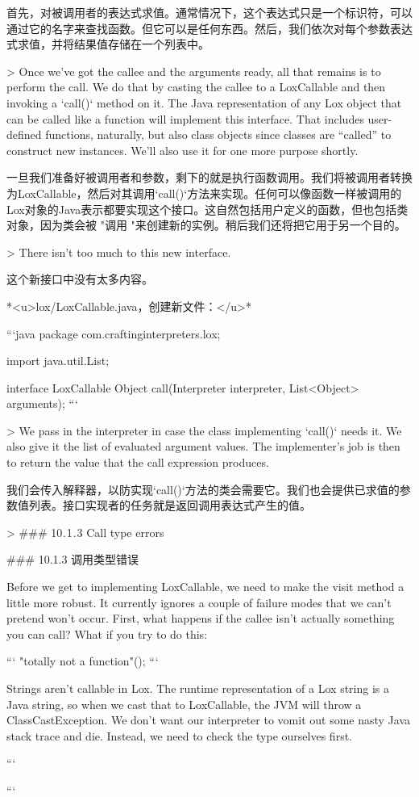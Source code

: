 \documentclass[cn,11pt,chinese]{elegantbook}
\begin{document}
{首先，对被调用者的表达式求值。通常情况下，这个表达式只是一个标识符，可以通过它的名字来查找函数。但它可以是任何东西。然后，我们依次对每个参数表达式求值，并将结果值存储在一个列表中。

> Once we’ve got the callee and the arguments ready, all that remains is to perform the call. We do that by casting the callee to a LoxCallable and then invoking a `call()` method on it. The Java representation of any Lox object that can be called like a function will implement this interface. That includes user-defined functions, naturally, but also class objects since classes are “called” to construct new instances. We’ll also use it for one more purpose shortly.

一旦我们准备好被调用者和参数，剩下的就是执行函数调用。我们将被调用者转换为LoxCallable，然后对其调用`call()`方法来实现。任何可以像函数一样被调用的Lox对象的Java表示都要实现这个接口。这自然包括用户定义的函数，但也包括类对象，因为类会被 "调用 "来创建新的实例。稍后我们还将把它用于另一个目的。

> There isn’t too much to this new interface.

这个新接口中没有太多内容。

*<u>lox/LoxCallable.java，创建新文件：</u>*

```java
package com.craftinginterpreters.lox;

import java.util.List;

interface LoxCallable {
  Object call(Interpreter interpreter, List<Object> arguments);
}
```

> We pass in the interpreter in case the class implementing `call()` needs it. We also give it the list of evaluated argument values. The implementer’s job is then to return the value that the call expression produces.

我们会传入解释器，以防实现`call()`方法的类会需要它。我们也会提供已求值的参数值列表。接口实现者的任务就是返回调用表达式产生的值。

> ### 10 . 1 . 3 Call type errors

### 10.1.3 调用类型错误

Before we get to implementing LoxCallable, we need to make the visit method a little more robust. It currently ignores a couple of failure modes that we can’t pretend won’t occur. First, what happens if the callee isn’t actually something you can call? What if you try to do this:

```
"totally not a function"();
```

Strings aren’t callable in Lox. The runtime representation of a Lox string is a Java string, so when we cast that to LoxCallable, the JVM will throw a ClassCastException. We don’t want our interpreter to vomit out some nasty Java stack trace and die. Instead, we need to check the type ourselves first.

```
    }
```
\end{document}

